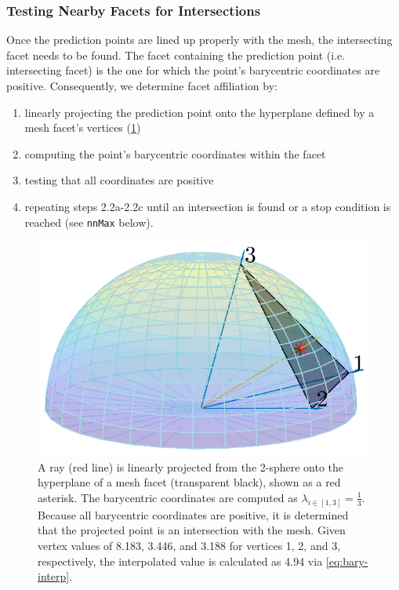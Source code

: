 \documentclass[final,twocolumn,12pt]{elsarticle}
\newcommand{\matlab}[1]{\mbox{\lstinline[style=Matlab-editor]{#1}}}
\newcommand{\outpt}{prediction}
\begin{document}
\begin{appendices}
\subsubsection{Testing Nearby Facets for Intersections}
\label{sec:app:bary:int:facets}
Once the \outpt{} points are lined up properly with the mesh, the intersecting facet needs to be found. The facet containing the \outpt{} point (i.e. intersecting facet) is the one for which the point's barycentric coordinates are positive. Consequently, we determine facet affiliation by:
\begin{enumerate}
    \item[2.2a] linearly projecting the \outpt{} point onto the hyperplane defined by a mesh facet's vertices (\cref{fig:bary-interp})
    \item[2.2b] computing the point's barycentric coordinates within the facet
    \item[2.2c] testing that all coordinates are positive \cite{langerSphericalBarycentricCoordinates2006}
    \item[2.2d] repeating steps 2.2a-2.2c until an intersection is found or a stop condition is reached (see \matlab{nnMax} below).
\end{enumerate}

\begin{figure}
    \centering
    \includegraphics[scale=1]{bary-interp.png}
    \caption{A ray (red line) is linearly projected from the 2-sphere onto the hyperplane of a mesh facet (transparent black), shown as a red asterisk. The barycentric coordinates are computed as $\lambda_{i \in [1,3]} = \frac{1}{3}$. Because all barycentric coordinates are positive, it is determined that the projected point is an intersection with the mesh. Given vertex values of \num{8.183}, \num{3.446}, and \num{3.188} for vertices 1, 2, and 3, respectively, the interpolated value is calculated as \num{4.94} via \cref{eq:bary-interp}.}
    \label{fig:bary-interp}
\end{figure}


\end{appendices}
\end{document}
